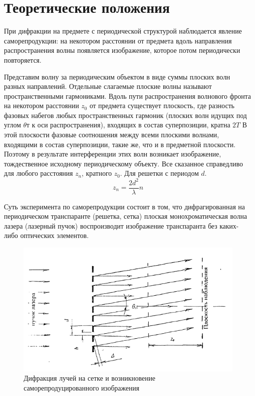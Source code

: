 \documentclass[a4paper]{article}
\begin{document}
\section{Теоретические положения}
При дифракции на предмете с периодической структурой наблюдается явление саморепродукции: на некотором расстоянии от предмета вдоль направления распространения волны появляется изображение, которое потом периодически повторяется.  \par
Представим волну за периодическим объектом в виде суммы плоских волн разных направлений. Отдельные слагаемые плоские волны называют пространственными гармониками. Вдоль пути распространения волнового фронта на некотором расстоянии $z_0$ от предмета существует плоскость, где разность фазовых набегов любых пространственных гармоник (плоских волн идущих под углом $\theta$т к оси распространения), входящих в состав суперпозиции, кратна $2T$ В этой плоскости фазовые соотношения между всеми плоскими волнами, входящими в состав суперпозиции, такие же, что и в предметной плоскости. Поэтому в результате интерференции этих волн возникает изображение, тождественное исходному периодическому объекту. Все сказанное справедливо для любого расстояния $z_n$, кратного $z_0$. Для решетки с периодом $d$.
\begin{equation}
    z_n = \frac{2d^2}{\lambda}n
\end{equation}

Суть эксперимента по саморепродукции состоит в том, что дифрагированная на периодическом транспаранте (решетка, сетка) плоская монохроматическая волна лазера (лазерный пучок) воспроизводит изображение транспаранта без каких-либо оптических элементов.

    \begin{figure}[h]
    \centering
    \includegraphics[width=15cm]{fig1.PNG}
    \caption{Дифракция лучей на сетке и возникновение саморепродуцированного изображения}
    \label{fig:vac}
\end{figure}
\end{document}

